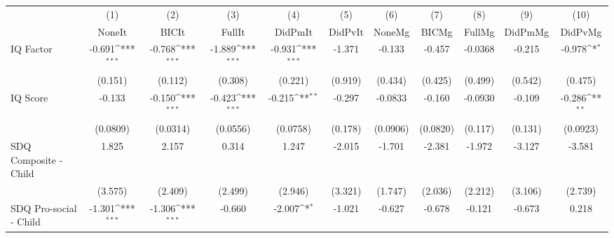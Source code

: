 {
\def\sym#1{\ifmmode^{#1}\else\(^{#1}\)\fi}
\begin{tabular}{l*{10}{c}}
\toprule
            &\multicolumn{1}{c}{(1)}&\multicolumn{1}{c}{(2)}&\multicolumn{1}{c}{(3)}&\multicolumn{1}{c}{(4)}&\multicolumn{1}{c}{(5)}&\multicolumn{1}{c}{(6)}&\multicolumn{1}{c}{(7)}&\multicolumn{1}{c}{(8)}&\multicolumn{1}{c}{(9)}&\multicolumn{1}{c}{(10)}\\
            &\multicolumn{1}{c}{NoneIt}&\multicolumn{1}{c}{BICIt}&\multicolumn{1}{c}{FullIt}&\multicolumn{1}{c}{DidPmIt}&\multicolumn{1}{c}{DidPvIt}&\multicolumn{1}{c}{NoneMg}&\multicolumn{1}{c}{BICMg}&\multicolumn{1}{c}{FullMg}&\multicolumn{1}{c}{DidPmMg}&\multicolumn{1}{c}{DidPvMg}\\
\midrule
IQ Factor   &      -0.691\sym{***}&      -0.768\sym{***}&      -1.889\sym{***}&      -0.931\sym{***}&      -1.371         &      -0.133         &      -0.457         &     -0.0368         &      -0.215         &      -0.978\sym{*}  \\
            &     (0.151)         &     (0.112)         &     (0.308)         &     (0.221)         &     (0.919)         &     (0.434)         &     (0.425)         &     (0.499)         &     (0.542)         &     (0.475)         \\
\addlinespace
IQ Score    &      -0.133         &      -0.150\sym{***}&      -0.423\sym{***}&      -0.215\sym{**} &      -0.297         &     -0.0833         &      -0.160         &     -0.0930         &      -0.109         &      -0.286\sym{**} \\
            &    (0.0809)         &    (0.0314)         &    (0.0556)         &    (0.0758)         &     (0.178)         &    (0.0906)         &    (0.0820)         &     (0.117)         &     (0.131)         &    (0.0923)         \\
\addlinespace
SDQ Composite - Child&       1.825         &       2.157         &       0.314         &       1.247         &      -2.015         &      -1.701         &      -2.381         &      -1.972         &      -3.127         &      -3.581         \\
            &     (3.575)         &     (2.409)         &     (2.499)         &     (2.946)         &     (3.321)         &     (1.747)         &     (2.036)         &     (2.212)         &     (3.106)         &     (2.739)         \\
\addlinespace
SDQ Pro-social - Child&      -1.301\sym{***}&      -1.306\sym{***}&      -0.660         &      -2.007\sym{*}  &      -1.021         &      -0.627         &      -0.678         &      -0.121         &      -0.673         &       0.218         \\

\end{tabular}}
